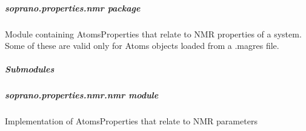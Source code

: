 \documentclass[letterpaper,10pt,english]{sphinxmanual}
\begin{document}
\subparagraph{soprano.properties.nmr package}
\label{doctree/soprano.properties.nmr:module-soprano.properties.nmr}\label{doctree/soprano.properties.nmr::doc}\label{doctree/soprano.properties.nmr:soprano-properties-nmr-package}
Module containing AtomsProperties that relate to NMR properties of a system.
Some of these are valid only for Atoms objects loaded from a .magres file.


\subparagraph{Submodules}
\label{doctree/soprano.properties.nmr:submodules}

\subparagraph{soprano.properties.nmr.nmr module}
\label{doctree/soprano.properties.nmr.nmr:module-soprano.properties.nmr.nmr}\label{doctree/soprano.properties.nmr.nmr::doc}\label{doctree/soprano.properties.nmr.nmr:soprano-properties-nmr-nmr-module}
Implementation of AtomsProperties that relate to NMR parameters
\end{document}
